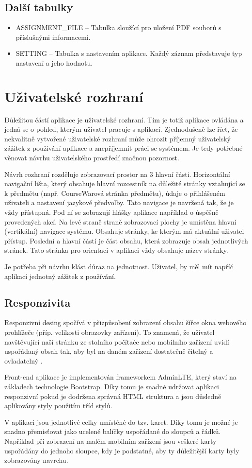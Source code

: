 \documentclass[czech,BP]{thesiskiv}
\begin{document}
		\subsection{Další tabulky}
			\begin{itemize}
				\item ASSIGNMENT\_FILE -- Tabulka sloužící pro uložení PDF souborů s příslušnými informacemi.
				\item SETTING -- Tabulka s nastavením aplikace. Každý záznam představuje typ nastavení a jeho hodnotu.
			\end{itemize}
	\section{Uživatelské rozhraní}
	\par Důležitou částí aplikace je uživatelské rozhraní. Tím je totiž aplikace ovládána a jedná se o pohled, kterým uživatel pracuje s aplikací. Zjednodušeně lze říct, že nekvalitně vytvořené uživatelské rozhraní může ohrozit příjemný uživatelský zážitek z používání aplikace a znepříjemnit práci se systémem. Je tedy potřebné věnovat návrhu uživatelského prostředí značnou pozornost.	
	\par Návrh rozhraní rozděluje zobrazovací prostor na 3 hlavní části. Horizontální navigační lišta, který obsahuje hlavní rozcestník na důležité stránky vztahující se k předmětu (např. CourseWarová stránka předmětu), údaje o přihlášeném uživateli a nastavení jazykové předvolby. Tato navigace je navržená tak, že je vždy přístupná. Pod ní se zobrazují hlášky aplikace například o úspěšně provedených akcí. Na levé straně straně zobrazovací plochy je umístěna hlavní (vertikální) navigace systému. Obsahuje stránky, ke kterým má aktuální uživatel přístup. Poslední a hlavní částí je část obsahu, která zobrazuje obsah jednotlivých stránek. Tato stránka pro orientaci v aplikaci vždy obsahuje název stránky.
	\par Je potřeba při návrhu klást důraz na jednotnost. Uživatel, by měl mít napříč aplikací jednotný zážitek z používání.
	
	\subsection{Responzivita}
	\par Responzivní desing spočívá v přizpůsobení zobrazení obsahu šířce okna webového prohlížeče (příp. velikosti obrazovky zařízení). To znamená, že uživatel navštěvující naší stránku ze stolního počítače nebo mobilního zařízení uvidí uspořádaný obsah tak, aby byl na daném zařízení dostatečně čitelný a ovladatelný \cite{CSSOkamzite}.
	\par Front-end aplikace je implementován frameworkem AdminLTE, který staví na základech technologie Bootstrap. Díky tomu je snadné udržovat aplikaci responzivní pokud je dodržena správná HTML struktura a jsou důsledně aplikovány styly použitím tříd stylů. 
	\par V aplikaci jsou jednotlivé celky umístěné do tzv. karet. Díky tomu je možné je snadno přemisťovat jako ucelené balíčky uspořádané do sloupců a řádků. Například při zobrazení na malém mobilním zařízení jsou veškeré karty uspořádány do jednoho sloupce, kdy je podstatné, aby ty důležitější karty byly zobrazovány navrchu.  
\end{document}

